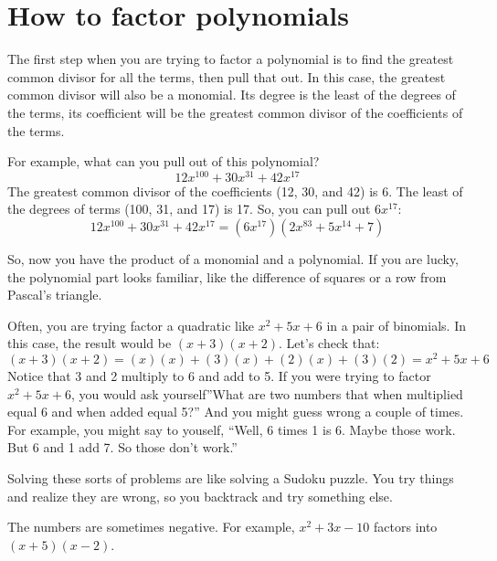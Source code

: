 \section{How to factor polynomials}

The first step when you are trying to factor a polynomial is to find
the greatest common divisor for all the terms, then pull that out. In
this case, the greatest common divisor will also be a monomial. Its
degree is the least of the degrees of the terms, its coefficient will
be the greatest common divisor of the coefficients of the terms.

For example, what can you pull out of this polynomial?
\begin{equation*}
12x^100 + 30x^31 + 42x^17
\end{equation*}
The greatest common divisor of the coefficients (12, 30, and 42) is 6.  The least of the degrees of terms (100, 31, and 17) is 17.  So, you can pull out $6x^17$:
\begin{equation*}
12x^100 + 30x^31 + 42x^17 = (6x^17)(2x^83 + 5x^14 + 7)
\end{equation*}

\begin{Exercise}[title={Factoring out the GCD monomial}, label=gcdmonomial]
  
\end{Exercise}
\begin{Answer}[ref=gcdmonomial]
  
\end{Answer}

So, now you have the product of a monomial and a polynomial. If you
are lucky, the polynomial part looks familiar, like the difference of
squares or a row from Pascal's triangle.

Often, you are trying factor a quadratic like $x^2 + 5x + 6$ in a pair
of binomials. In this case, the result would be $(x + 3)(x + 2)$. Let's check that:
\begin{equation*}
  (x + 3)(x + 2) = (x)(x) + (3)(x) + (2)(x) + (3)(2) = x^2 + 5x + 6
\end{equation*}
Notice that 3 and 2 multiply to 6 and add to 5. If you were trying to
factor $x^2 + 5x + 6$, you would ask yourself''What are two numbers that
when multiplied equal 6 and when added equal 5?'' And you might
guess wrong a couple of times. For example, you might say to youself,
``Well, 6 times 1 is 6. Maybe those work. But 6 and 1 add 7. So those
don't work.''

Solving these sorts of problems are like solving a Sudoku puzzle. You
try things and realize they are wrong, so you backtrack and try
something else.

The numbers are sometimes negative. For example, $x^2 + 3x - 10$ factors into $(x + 5)(x - 2)$.

\begin{Exercise}[title={Factoring quadratics}, label=factorquadratics]
  
\end{Exercise}
\begin{Answer}[ref=factorquadratics]
  
\end{Answer}
